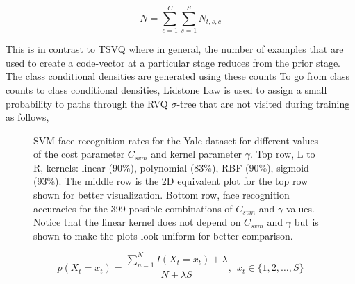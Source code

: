 \begin{Body}
\begin{enumerate}
\begin{enumerate}
\begin{equation}
N = \sum\limits_{c=1}^C\sum\limits_{s=1}^{S} N_{t,s,c}
\end{equation}

This is in contrast to TSVQ where in general, the number of examples that are used to create a  code-vector at a particular stage reduces from the prior stage.  The class conditional densities are generated using these counts
To go from class counts to class conditional densities, Lidstone Law is used to assign a small probability to paths through the RVQ $\sigma$-tree that are not visited during training as follows,

									\begin{figure}[t]
									\centering
									\caption{SVM face recognition rates for the Yale dataset for different values of the cost parameter $C_{svm}$ and kernel parameter $\gamma$.  Top row, L to R, kernels: linear (90\%), polynomial (83\%), RBF (90\%), sigmoid (93\%).  The middle row is the 2D equivalent plot for the top row shown for better visualization.  Bottom row, face recognition accuracies for the 399 possible combinations of $C_{svm}$ and $\gamma$ values.  Notice that the linear kernel does not depend on $C_{svm}$ and $\gamma$ but is shown to make the plots look uniform for better comparison.}
									\label{fig:SVM_yaleface_results}
									\end{figure}



\begin{equation}
p(X_t=x_t) = \frac{\sum\limits_{n=1}^{N}I(X_t=x_t)+\lambda}{N+\lambda S}, \ \ x_t \in \{1, 2, \dots, S\}
\end{equation}
  

\end{enumerate}
\end{enumerate}
\end{Body}

